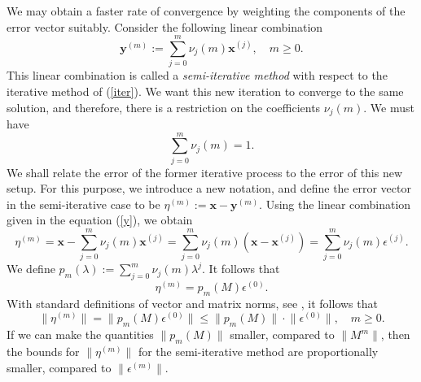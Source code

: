 \documentclass[reqno]{amsart}
\newcommand{\mb}{\mathbf}
\numberwithin{equation}{section}
\theoremstyle{plain}
\theoremstyle{definition}
\begin{document}
We may obtain a faster rate of convergence by weighting the components of the error vector suitably. Consider the following linear combination
\begin{equation}\label{y}
	\mb{y}^{(m)} := \sum_{j=0}^{m} \nu_j(m)\mb{x}^{(j)}, \quad m\geq 0.
\end{equation}
This linear combination is called a \textit{semi-iterative method} with respect to the iterative method of (\ref{iter}). We want this new iteration to converge to the same solution, and therefore, there is a restriction on the coefficients $\nu_j(m)$. We must have
\begin{equation}\label{restrict}
	\sum_{j=0}^{m} \nu_j(m)=1.
\end{equation}
We shall relate the error of the former iterative process to the error of this new setup. For this purpose, we introduce a new notation, and define the error vector in the semi-iterative case to be $\eta^{(m)}:=\mb{x}-\mb{y}^{(m)}$.  Using the linear combination given in the equation (\ref{y}), we obtain 
\begin{equation*}
	\eta^{(m)} =\mb{x}-\sum_{j=0}^{m} \nu_j(m)\mb{x}^{(j)} = \sum_{j=0}^{m} \nu_j(m)(\mb{x}-\mb{x}^{(j)}) = \sum_{j=0}^{m} \nu_j(m)\epsilon^{(j)}.
\end{equation*}
We define $p_m(\lambda) := \sum_{j=0}^{m} \nu_j(m)\lambda^j$. It follows that 
\begin{equation}\label{eta}
	\eta^{(m)} = p_m(M)\epsilon^{(0)}.
\end{equation}
With standard definitions of vector and matrix norms, see \cite{varga}, it follows that 
\begin{equation*}
	\lVert\eta^{(m)}\rVert = \lVert  p_m(M)\epsilon^{(0)} \rVert \leq \lVert  p_m(M)\rVert \cdot \lVert\epsilon^{(0)} \rVert, \quad m\geq 0.
\end{equation*}
If we can make the quantities $\lVert p_m(M)\rVert$ smaller, compared to $\lVert M^m\rVert$, then the bounds for $\lVert\eta^{(m)} \rVert$ for the semi-iterative method are proportionally smaller, compared to $\lVert\epsilon^{(m)}\rVert$.
\end{document}
